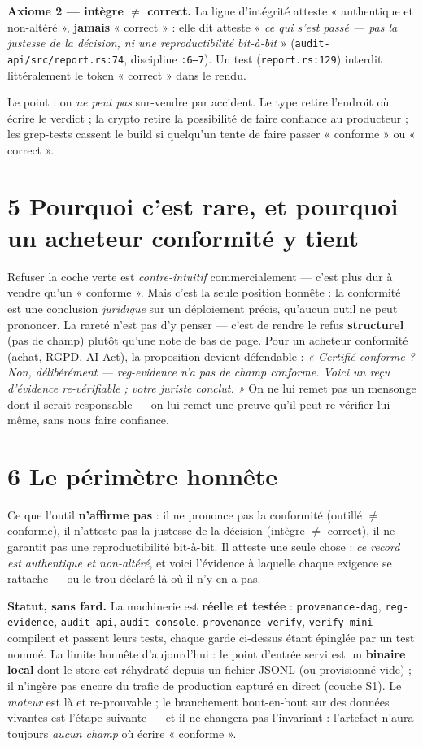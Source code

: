 \documentclass[11pt]{article}
\begin{document}
\smallskip
\textbf{Axiome 2 — intègre $\neq$ correct.} La ligne d'intégrité atteste « authentique et
non-altéré », \textbf{jamais} « correct » : elle dit atteste « \emph{ce qui s'est passé — pas la
justesse de la décision, ni une reproductibilité bit-à-bit} » (\texttt{audit-api/src/report.rs:74},
discipline \texttt{:6--7}). Un test (\texttt{report.rs:129}) interdit littéralement le token
« correct » dans le rendu.

\smallskip
Le point : on \emph{ne peut pas} sur-vendre par accident. Le type retire l'endroit où écrire le
verdict ; la crypto retire la possibilité de faire confiance au producteur ; les grep-tests
cassent le build si quelqu'un tente de faire passer « conforme » ou « correct ».

\section{5 \;\textbar\; Pourquoi c'est rare, et pourquoi un acheteur conformité y tient}
Refuser la coche verte est \emph{contre-intuitif} commercialement — c'est plus dur à vendre
qu'un « conforme ». Mais c'est la seule position honnête : la conformité est une conclusion
\emph{juridique} sur un déploiement précis, qu'aucun outil ne peut prononcer. La rareté n'est pas
d'y penser — c'est de rendre le refus \textbf{structurel} (pas de champ) plutôt qu'une note de bas
de page. Pour un acheteur conformité (achat, RGPD, AI Act), la proposition devient défendable :
\emph{« Certifié conforme ? Non, délibérément — reg-evidence n'a pas de champ conforme. Voici un
reçu d'évidence re-vérifiable ; votre juriste conclut. »} On ne lui remet pas un mensonge dont il
serait responsable — on lui remet une preuve qu'il peut re-vérifier lui-même, sans nous faire
confiance.

\section{6 \;\textbar\; Le périmètre honnête}
Ce que l'outil \textbf{n'affirme pas} : il ne prononce pas la conformité (outillé $\neq$
conforme), il n'atteste pas la justesse de la décision (intègre $\neq$ correct), il ne garantit
pas une reproductibilité bit-à-bit. Il atteste une seule chose : \emph{ce record est authentique
et non-altéré}, et voici l'évidence à laquelle chaque exigence se rattache — ou le trou déclaré
là où il n'y en a pas.

\smallskip
\textbf{Statut, sans fard.} La machinerie est \textbf{réelle et testée} : \texttt{provenance-dag},
\texttt{reg-evidence}, \texttt{audit-api}, \texttt{audit-console}, \texttt{provenance-verify},
\texttt{verify-mini} compilent et passent leurs tests, chaque garde ci-dessus étant épinglée par
un test nommé. La limite honnête d'aujourd'hui : le point d'entrée servi est un \textbf{binaire
local} dont le store est réhydraté depuis un fichier JSONL (ou provisionné vide) ; il n'ingère pas
encore du trafic de production capturé en direct (couche S1). Le \emph{moteur} est là et re-prouvable ;
le branchement bout-en-bout sur des données vivantes est l'étape suivante — et il ne changera pas
l'invariant : l'artefact n'aura toujours \emph{aucun champ} où écrire « conforme ».
\end{document}
